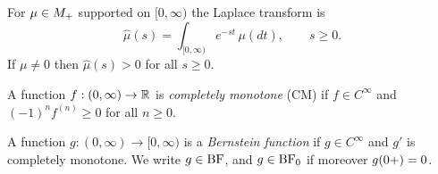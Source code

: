 For $\mu \in M_+$ supported on $[0,\infty)$ the Laplace transform is
\[
  \hat\mu(s) = \int_{[0,\infty)} e^{-st}\,\mu(dt), \qquad s \ge 0 .
\]
If $\mu \ne 0$ then $\hat\mu(s) > 0$ for all $s \ge 0$.

\begin{definition}\label{def:completely-monotone}
A function $f : (0,\infty) \to \mathbb{R}$ is \emph{completely monotone} (CM) if $f \in C^\infty$
and $(-1)^n f^{(n)} \ge 0$ for all $n \ge 0$.
\statusT
\end{definition}

\begin{definition}\label{def:bernstein-function}
A function $g : (0,\infty) \to [0,\infty)$ is a \emph{Bernstein function} if $g \in C^\infty$
and $g'$ is completely monotone. We write $g \in \mathrm{BF}$, and $g \in \mathrm{BF}_0$ if moreover
$g(0{+}) = 0$.
\statusT
\end{definition}

